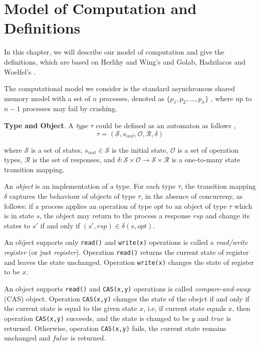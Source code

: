 
\chapter{Model of Computation and Definitions}
In this chapter, we will describe our model of computation and give the definitions, which are based on Herlihy
and Wing's \cite{Herlihy:1990:LCC:78969.78972} and Golab, Hadzilacos and Woelfel's \cite{InProc-GHHW2007a}.

The computational model we consider is the standard asynchronous shared memory model with a set of $n$ processes,
denoted as $\{p_1, p_2,...,p_n\}$ , where up to $n-1$ processes may fail by crashing.


\textbf{Type and Object}.
A \emph{type} $\tau$ could be defined as an automaton as follows \cite{InProc-GHHW2007a},
$$\tau = (\mathcal{S}, s_{init},\mathcal{O},\mathcal{R} ,\delta )$$

where $\mathcal{S}$ is a set of states, $s_{init} \in \mathcal{S}$ is the initial state, $\mathcal{O}$ is a set of
operation types, $\mathcal{R}$ is the set of responses, and
$\delta :\mathcal{S} \times \mathcal{O} \to \mathcal{S} \times \mathcal{R}$ is a one-to-many state transition mapping.

An \emph{object} is an implementation of a type. For each type $\tau$, the transition mapping $\delta$ captures the
behaviour of objects of type $\tau$, in the absence of concurreny,
as follows: if a process applies an operation of type $opt$ to an object of type $\tau$ which is in state $s$, the object
may return to the process a response $rsp$ and change its states to $s'$ if and only if $(s', rsp) \in \delta(s, opt)$.

An object supports only \texttt{read()} and \texttt{write(x)} operations is called a \emph{read/write register}
(or just \emph{register}). Operation \texttt{read()} returns the current state of register and leaves the state unchanged.
Operation \texttt{write(x)} changes the state of register to be $x$.

An object supports \texttt{read()} and \texttt{CAS(x,y)} operations is called \emph{compare-and-swap} (CAS) object.
Operation \texttt{CAS(x,y)} changes the state of the obejct if and only if the current state is equal to the given state $x$, i.e,
if current state equals $x$, then operation \texttt{CAS(x,y)} succeeds, and the state is changed
to be $y$ and $true$ is returned. Otherwise, operation \texttt{CAS(x,y)} fails, the current state remains unchanged and
$false$ is returned.

